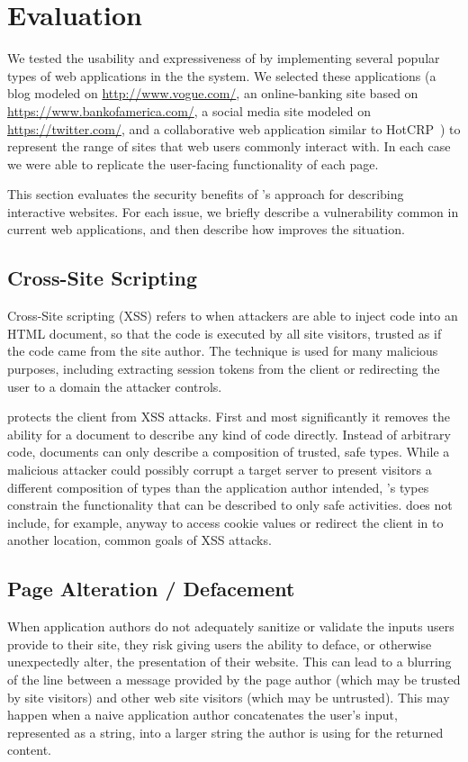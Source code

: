 \section{Evaluation}
\label{future-web:evaluation}

We tested the usability and expressiveness of \CDF by implementing several
popular types of web applications in the the system.  We selected
these applications (a blog modeled on \url{http://www.vogue.com/},
an online-banking site based on \url{https://www.bankofamerica.com/}, a social
media site modeled on \url{https://twitter.com/}, and a collaborative web application similar to
HotCRP~\cite{hotCRPhomepage}) to represent the range of sites that web users
commonly interact with.  In each case we were able to replicate the
user-facing functionality of each page.

This section evaluates the security benefits of \CDF's approach for describing
interactive websites.  For each issue, we briefly
describe a vulnerability common in current web applications, and then
describe how \CDF improves the situation.


\subsection{Cross-Site Scripting}
Cross-Site scripting (XSS) refers to when attackers are able to inject \JS code
into an HTML document, so that the code is executed by all site visitors, trusted
as if the code came from the site author.  The technique is used for many
malicious purposes, including extracting session tokens from the client or
redirecting the user to a domain the attacker controls.

\CDF protects the client from XSS attacks.  First and most
significantly it removes the ability for a document to describe any kind of
\JS code directly.  Instead of arbitrary code, \CDF documents can only describe
a composition of trusted, safe types.  While a malicious attacker could
possibly corrupt a target server to present visitors a different
composition of types than the application author intended, \CDF's types
constrain the functionality that can be described to only safe activities.  \CDF
does not include, for example, anyway to access cookie values or
redirect the client in \JS to another location, common goals of XSS attacks.


\subsection{Page Alteration / Defacement}
When application authors do not adequately sanitize or validate the inputs
users provide to their site, they risk giving users the ability to deface, or
otherwise unexpectedly alter, the presentation of their website.  This
can lead to a blurring of the line between a message provided by the page
author (which may be trusted by site visitors) and other web site visitors
(which may be untrusted).  This may happen when a naive application
author concatenates the user's input, represented
as a string, into a larger string the author is using for the returned
content.

